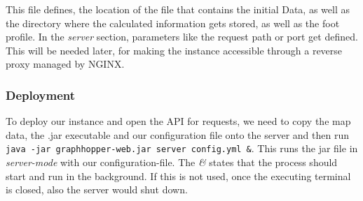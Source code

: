 This file defines, the location of the file that contains the initial Data, as well as the directory where the calculated information gets stored, as well as the foot profile. In the \textit{server} section, parameters like the request path or port get defined. This will be needed later, for making the instance accessible through a reverse proxy managed by NGINX. 

\subsubsection{Deployment}
To deploy our instance and open the API for requests, we need to copy the map data, the .jar executable and our configuration file onto the server and then run \texttt{java -jar graphhopper-web.jar server config.yml \&}. This runs the jar file in \textit{server-mode} with our configuration-file. The \textit{\&} states that the process should start and run in the background. If this is not used, once the executing terminal is closed, also the server would shut down.

\newpage